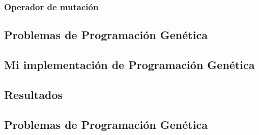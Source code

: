 \subsubsection{Operador de mutación}


\subsection{Problemas de Programación Genética}

\subsection{Mi implementación de Programación Genética}

\subsection{Resultados}

\subsection{Problemas de Programación Genética}
